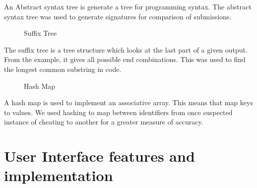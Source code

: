 \documentclass[11pt,a4paper]{article}
\begin{document}
An Abstract syntax tree is generate a tree for programming syntax. The abstract syntax tree was used to generate signatures for comparison of submissions.

\begin{figure}[h!]
  \caption{Suffix Tree}
  \label{fig:suffixtree}
\end{figure}

The suffix tree is a tree structure which looks at the last part of a
given output. From the example, it gives all possible end combinations. This was
used to find the longest common substring in code.

\begin{figure}[h!]
  \caption{Hash Map}
  \label{fig:hashmap}
\end{figure}

A hash map is used to implement an associative array. This means that  map keys to values. We used hashing to map between identifiers from once suspected instance of cheating to another for a greater measure of accuracy.


\section{User Interface features and implementation}
\end{document}
